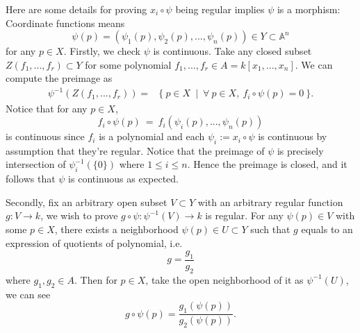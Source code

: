 Here are some details for proving $x_i\circ \psi$ being regular implies $\psi$ is a morphism:
Coordinate functions means 
\[\psi(p)=(\psi_1(p),\psi_2(p),...,\psi_n(p))\in Y\subset \mathbb A^n\] for any $p\in X$.
Firstly, we check $\psi$ is continuous. Take any closed subset $Z(f_1,...,f_r)\subset Y$ for some polynomial $f_1,...,f_r\in A=k[x_1,...,x_n]$. We can compute the preimage as \begin{align*}
    \psi^{-1}(Z(f_1,...,f_r)) =& \{~ p\in X ~\mid ~\forall~ p\in X,~ f_i\circ \psi(p)=0 ~\}.
\end{align*}
Notice that for any $p\in X$, \[f_i\circ \psi(p) ~=~ f_i(\psi_i(p),...,\psi_n(p))\] is continuous since $f_i$ is a polynomial and each $\psi_i:=x_i\circ \psi$ is continuous by assumption that they're regular.
Notice that the preimage of $\psi$ is precisely intersection of $\psi_i^{-1}(\{0\})$ where $1\leq i\leq n$. Hence the preimage is closed, and it follows that $\psi$ is continuous as expected. 

Secondly, fix an arbitrary open subset $V\subset Y$ with an arbitrary regular function $g:V\to k$, we wish to prove $g\circ \psi:\psi^{-1}(V)\to k$ is regular. For any $\psi(p)\in V$ with some $p\in X$, there exists a neighborhood $\psi(p)\in U\subset Y$ such that $g$ equals to an expression of quotients of polynomial, i.e. \[g=\frac{g_1}{g_2}\] where $g_1,g_2\in A$. Then for $p\in X$, take the open neighborhood of it as $\psi^{-1}(U)$, we can see 
\[g\circ \psi (p) = \frac{g_1(\psi(p))}{g_2(\psi(p))}.\]